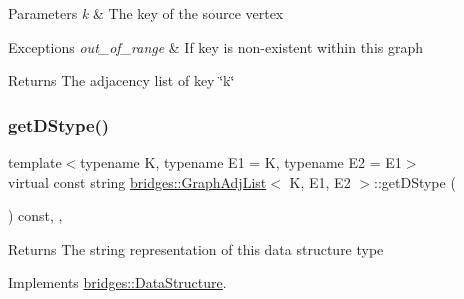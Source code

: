 \begin{DoxyParams}{Parameters}
{\em k} & The key of the source vertex \\
\hline
\end{DoxyParams}

\begin{DoxyExceptions}{Exceptions}
{\em out\+\_\+of\+\_\+range} & If key is non-\/existent within this graph\\
\hline
\end{DoxyExceptions}
\begin{DoxyReturn}{Returns}
The adjacency list of key \char`\"{}k\char`\"{} 
\end{DoxyReturn}
\mbox{\label{classbridges_1_1_graph_adj_list_ab1aeeed39ac0e0f66a677e7b0e722030}} 
\subsubsection{\texorpdfstring{get\+D\+Stype()}{getDStype()}}
{\footnotesize\ttfamily template$<$typename K, typename E1 = K, typename E2 = E1$>$ \\
virtual const string \mbox{\hyperlink{classbridges_1_1_graph_adj_list}{bridges\+::\+Graph\+Adj\+List}}$<$ K, E1, E2 $>$\+::get\+D\+Stype (\begin{DoxyParamCaption}{ }\end{DoxyParamCaption}) const\hspace{0.3cm}{\ttfamily [inline]}, {\ttfamily [override]}, {\ttfamily [virtual]}}

\begin{DoxyReturn}{Returns}
The string representation of this data structure type 
\end{DoxyReturn}


Implements \mbox{\hyperlink{classbridges_1_1_data_structure_a957a63b106e340bc753620c650632bdc}{bridges\+::\+Data\+Structure}}.

\mbox{\label{classbridges_1_1_graph_adj_list_a3e4b21d0ff4b277502b2bb10e57df3c7}} 
